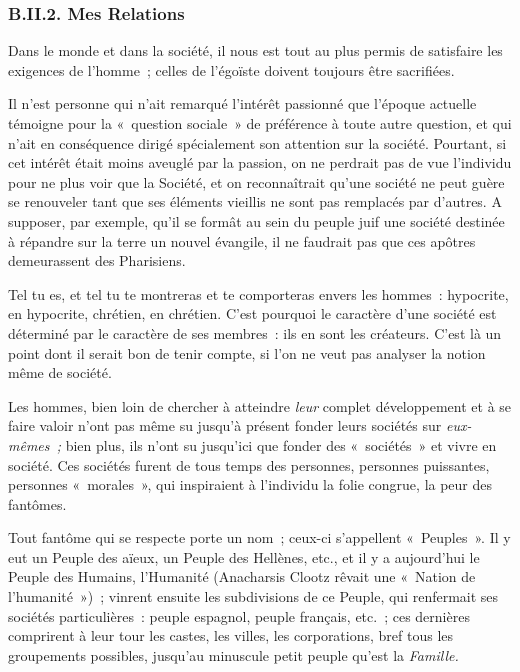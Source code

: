 \documentclass[french,twoside]{book} %
\begin{document}
\subsubsection[{B.II.2. Mes Relations}]{B.II.2. Mes Relations}
\noindent Dans le monde et dans la société, il nous est tout au plus permis de satisfaire les exigences de l’homme ; celles de l’égoïste doivent toujours être sacrifiées.\par
Il n’est personne qui n’ait remarqué l’intérêt passionné que l’époque actuelle témoigne pour la « question sociale » de préférence à toute autre question, et qui n’ait en conséquence dirigé spécialement son attention sur la société. Pourtant, si cet intérêt était  moins aveuglé par la passion, on ne perdrait pas de vue l’individu pour ne plus voir que la Société, et on reconnaîtrait qu’une société ne peut guère se renouveler tant que ses éléments vieillis ne sont pas remplacés par d’autres. A supposer, par exemple, qu’il se formât au sein du peuple juif une société destinée à répandre sur la terre un nouvel évangile, il ne faudrait pas que ces apôtres demeurassent des Pharisiens.\par
Tel tu es, et tel tu te montreras et te comporteras envers les hommes : hypocrite, en hypocrite, chrétien, en chrétien. C’est pourquoi le caractère d’une société est déterminé par le caractère de ses membres : ils en sont les créateurs. C’est là un point dont il serait bon de tenir compte, si l’on ne veut pas analyser la notion même de société.\par
Les hommes, bien loin de chercher à atteindre \emph{leur} complet développement et à se faire valoir n’ont pas même su jusqu’à présent fonder leurs sociétés sur \emph{eux-mêmes ;} bien plus, ils n’ont su jusqu’ici que fonder des « sociétés » et vivre en société. Ces sociétés furent de tous temps des personnes, personnes puissantes, personnes « morales », qui inspiraient à l’individu la folie congrue, la peur des fantômes.\par
Tout fantôme qui se respecte porte un nom ; ceux-ci s’appellent « Peuples ». Il y eut un Peuple des aïeux, un Peuple des Hellènes, etc., et il y a aujourd’hui le Peuple des Humains, l’Humanité (Anacharsis Clootz rêvait une « Nation de l’humanité ») ; vinrent ensuite les subdivisions de ce Peuple, qui renfermait ses sociétés particulières : peuple espagnol, peuple français, etc. ; ces dernières comprirent à leur tour les castes, les villes, les corporations, bref tous les groupements possibles, jusqu’au minuscule petit peuple qu’est la \emph{Famille.}\par
\end{document}
